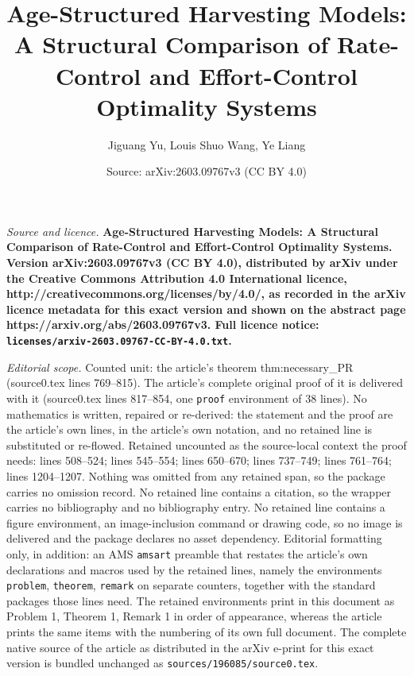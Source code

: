 \documentclass[10pt,a4paper]{amsart}
\title{\bfseries Age-Structured Harvesting Models: A Structural Comparison of Rate-Control and Effort-Control Optimality Systems}
\author{Jiguang Yu, Louis Shuo Wang, Ye Liang}
\date{Source: arXiv:2603.09767v3 (CC BY 4.0)}
\begin{document}
\maketitle

\noindent\emph{Source and licence.} \bfseries Age-Structured Harvesting Models: A Structural Comparison of Rate-Control and Effort-Control Optimality Systems. Version arXiv:2603.09767v3 (CC BY 4.0), distributed by arXiv under the Creative Commons Attribution 4.0 International licence, http://creativecommons.org/licenses/by/4.0/, as recorded in the arXiv licence metadata for this exact version and shown on the abstract page https://arxiv.org/abs/2603.09767v3. Full licence notice: \texttt{licenses/arxiv-2603.09767-CC-BY-4.0.txt}.\par\smallskip

\noindent\textit{Editorial scope.} Counted unit: the article's theorem thm:necessary\_PR (source0.tex lines 769--815). The article's complete original proof of it is delivered with it (source0.tex lines 817--854, one \texttt{proof} environment of 38 lines). No mathematics is written, repaired or re-derived: the statement and the proof are the article's own lines, in the article's own notation, and no retained line is substituted or re-flowed.  Retained uncounted as the source-local context the proof needs: lines 508--524; lines 545--554; lines 650--670; lines 737--749; lines 761--764; lines 1204--1207.  Nothing was omitted from any retained span, so the package carries no omission record.  No retained line contains a citation, so the wrapper carries no bibliography and no bibliography entry.  No retained line contains a figure environment, an image-inclusion command or drawing code, so no image is delivered and the package declares no asset dependency.  Editorial formatting only, in addition: an AMS \texttt{amsart} preamble that restates the article's own declarations and macros used by the retained lines, namely the environments \texttt{problem}, \texttt{theorem}, \texttt{remark} on separate counters, together with the standard packages those lines need.  The retained environments print in this document as Problem 1, Theorem 1, Remark 1 in order of appearance, whereas the article prints the same items with the numbering of its own full document.  The complete native source of the article as distributed in the arXiv e-print for this exact version is bundled unchanged as \texttt{sources/196085/source0.tex}.
\end{document}
